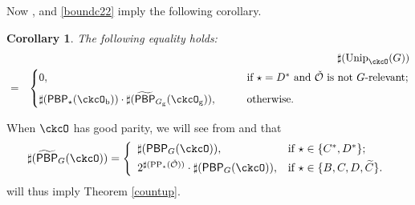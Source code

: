 \documentclass[12pt]{amsart}
\newcommand{\CK}{{\mathcal {K}}}
\newcommand{\CO}{{\mathcal {O}}}
\numberwithin{equation}{section}
\newtheorem{prop}[thm]{Proposition}
\newtheorem{cor}[thm]{Corollary}
\theoremstyle{remark}
\def\Unip{\mathrm{Unip}}
\def\LC{{}^{\scriptscriptstyle L}\sC}
\def\Coh{\mathrm{Coh}}
\def\CPPs{\mathrm{PP}_{\star}}
\def\tPBP{\widetilde{\mathsf{PBP}}}
\def\PBP{\mathsf{PBP}}
\def\tPBP{\widetilde{\mathsf{PBP}}}
\begin{document}
Now ,  and \eqref{boundc22} imply the following corollary.
\begin{cor}\label{prop:countBCD22}
 The following equality holds:
  \begin{eqnarray*}
 && \sharp(\Unip_{\ckcO}(G))\\
  & = & \begin{cases}
    0,  \qquad &  \text{if $\star=D^*$ and $\check \CO$ is not $G$-relevant;}\medskip \\
          \sharp (\PBP_{\star}(\ckcO_{\mathrm b}))\cdot \sharp(\tPBP_{G_{\mathrm g}}(\ckcO_{\mathrm g})), \qquad & \text{otherwise.}
       \end{cases}
  \end{eqnarray*}
 \end{cor}



When $\ckcO $ has good parity, we will see from  and  that
  \[
    \sharp(\tPBP_{G}(\ckcO)) =
    \left\{
    \begin{array}{ll}
       \sharp (\PBP_{G}(\ckcO)),  & \hbox{if $\star\in \{C^*,D^*\}$}; \smallskip\\
       2^{\sharp(\CPPs(\check \CO))} \cdot \sharp (\PBP_{G}(\ckcO)),  &\hbox{if $\star\in \{B, C,D,\widetilde {C}\}$}.
    \end{array}
  \right.
  \]
  will thus imply Theorem \ref{countup}.%



\end{document}
